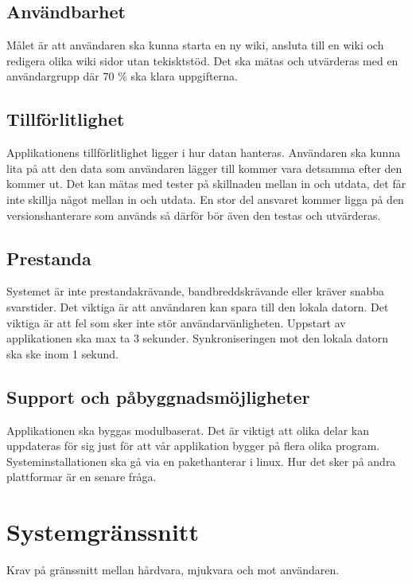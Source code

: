 \subsection{Användbarhet}
Målet är att användaren ska kunna starta en ny wiki, ansluta till en wiki och redigera olika wiki sidor utan tekisktstöd. Det ska mätas och utvärderas med en användargrupp där 70 \% ska klara uppgifterna. 

\subsection{Tillförlitlighet} 
Applikationens tillförlitlighet ligger i hur datan hanteras. Användaren ska kunna lita på att den data som användaren lägger till kommer vara detsamma efter den kommer ut. Det kan mätas med tester på skillnaden mellan in och utdata, det får inte skillja något mellan in och utdata. En stor del ansvaret kommer ligga på den versionshanterare som används så därför bör även den testas och utvärderas. 

\subsection{Prestanda}
Systemet är inte prestandakrävande, bandbreddskrävande eller kräver snabba svarstider. Det viktiga är att användaren kan spara till den lokala datorn. Det viktiga är att fel som sker inte stör användarvänligheten. Uppstart av applikationen ska max ta 3 sekunder. Synkroniseringen mot den lokala datorn ska ske inom 1 sekund. 

\subsection{Support och påbyggnadsmöjligheter} 
Applikationen ska byggas modulbaserat. Det är viktigt att olika delar kan uppdateras för sig just för att vår applikation bygger på flera olika program. Systeminstallationen ska gå via en pakethanterar i linux.  Hur det sker på andra plattformar är en senare fråga.


\section{Systemgränssnitt}
Krav på gränssnitt mellan hårdvara, mjukvara och mot användaren. 
